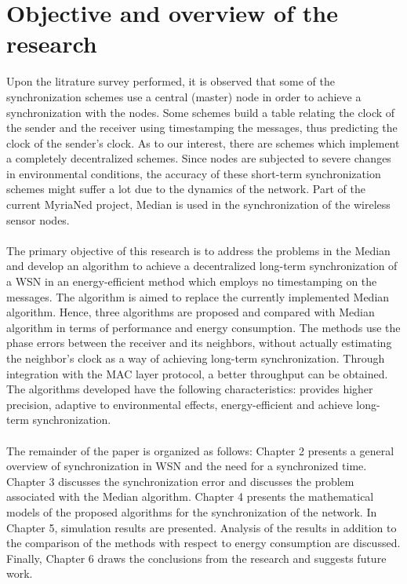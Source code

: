 \documentclass[a4paper,10pt]{report}
\begin{document}
\section{\textbf{Objective and overview of the research}}
Upon the litrature survey performed, it is observed that some of the synchronization schemes use a central (master) node in order to achieve a synchronization with the nodes. Some schemes build a table relating the clock of the sender and the receiver using timestamping the messages, thus predicting the clock of the sender's clock. As to our interest, there are schemes which implement a completely decentralized schemes. Since nodes are subjected to severe changes in environmental conditions, the accuracy of these short-term synchronization schemes might suffer a lot due to the dynamics of the network. Part of the current MyriaNed project, Median is used in the synchronization of the wireless sensor nodes.
\paragraph*{}
The primary objective of this research is to address the problems in the Median and develop an algorithm to achieve a decentralized long-term synchronization of a WSN in an energy-efficient method which employs no timestamping on the messages. The algorithm is aimed to replace the currently implemented Median algorithm.  Hence, three algorithms are proposed and compared with Median algorithm in terms of performance and energy consumption. The methods use the phase errors between the receiver and its neighbors, without actually estimating the neighbor's clock as a way of achieving long-term synchronization. Through integration with the MAC layer protocol, a better throughput can be obtained. The algorithms developed have the following characteristics: provides higher precision, adaptive to environmental effects, energy-efficient and achieve long-term synchronization.
\paragraph*{} The remainder of the paper is organized as follows:  Chapter 2 presents a general overview of synchronization in WSN and the need for a synchronized time. Chapter 3 discusses the synchronization error and discusses the problem associated with the Median algorithm. Chapter 4 presents the mathematical models of the proposed algorithms for the synchronization of the network. In Chapter 5, simulation results are presented. Analysis of the results in addition to the comparison of the methods with respect to energy consumption are discussed. Finally, Chapter 6 draws the conclusions from the research and suggests future work.
\end{document}
